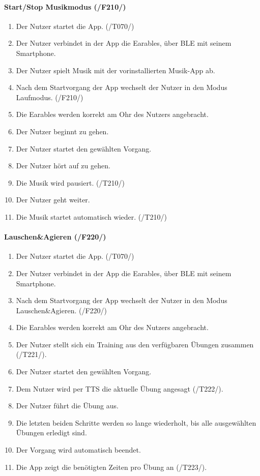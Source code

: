 \documentclass[a4paper,12pt]{article}
\begin{document}
    
    \paragraph{Start/Stop Musikmodus (/F210/)}
      \begin{enumerate}
        \item Der Nutzer startet die App. (/T070/)
        \item Der Nutzer verbindet in der App die \gls{Earables}, über \gls{BLE} mit seinem Smartphone.
        \item Der Nutzer spielt Musik mit der vorinstallierten Musik-App ab.
        \item Nach dem Startvorgang der App wechselt der Nutzer in den Modus \glqq Laufmodus\grqq . (/F210/)
        \item Die \Gls{Earables} werden korrekt am Ohr des Nutzers angebracht.
        \item Der Nutzer beginnt zu gehen.
        \item Der Nutzer startet den gewählten \Gls{Vorgang}.
        \item Der Nutzer hört auf zu gehen.
        \item Die Musik wird pausiert. (/T210/)
        \item Der Nutzer geht weiter.
        \item Die Musik startet automatisch wieder. (/T210/)
      \end{enumerate}
  
      \paragraph{Lauschen\&Agieren (/F220/)}
      \begin{enumerate}
        \item Der Nutzer startet die App. (/T070/)
        \item Der Nutzer verbindet in der App die \gls{Earables}, über \gls{BLE} mit seinem Smartphone.
        \item Nach dem Startvorgang der App wechselt der Nutzer in den Modus \glqq Lauschen\&Agieren\grqq . (/F220/)
        \item Die \Gls{Earables} werden korrekt am Ohr des Nutzers angebracht.
        \item Der Nutzer stellt sich ein Training aus den verfügbaren Übungen zusammen (/T221/).
        \item Der Nutzer startet den gewählten \Gls{Vorgang}.
        \item Dem Nutzer wird per \Gls{TTS} die aktuelle Übung angesagt (/T222/).
        \item Der Nutzer führt die Übung aus.
        \item Die letzten beiden Schritte werden so lange wiederholt, bis alle ausgewählten Übungen erledigt sind.
        \item Der \Gls{Vorgang} wird automatisch beendet.
        \item Die App zeigt die benötigten Zeiten pro Übung an (/T223/).
      \end{enumerate}
\end{document}
